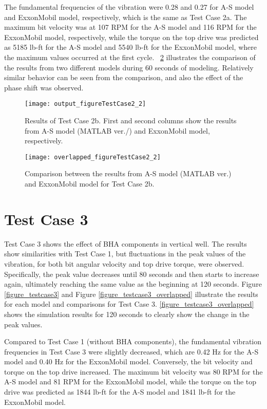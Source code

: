 The fundamental frequencies of the vibration were 0.28 and 0.27 for A-S model and ExxonMobil model, respectively, which is the same as Test Case 2a. The maximum bit velocity was at 107 RPM for the A-S model and 116 RPM for the ExxonMobil model, respectively, while the torque on the top drive was predicted as 5185 lb-ft for the A-S model and 5540 lb-ft for the ExxonMobil model, where the maximum values occurred at the first cycle. \figurename~\ref{figure_testcase2_2_overlapped} illustrates the comparison of the results from two different models during 60 seconds of modeling. Relatively similar behavior can be seen from the comparison, and also the effect of the phase shift was observed.

\begin{figure}
  \centering
  \texttt{[image: output\_figureTestCase2\_2]}
  \caption[Results of Test Case 2b]{Results of Test Case 2b. First and second columns show the results from A-S model (MATLAB ver./) and ExxonMobil model, respectively.}\label{figure_testcase2_2}
\end{figure}

\begin{figure}
  \centering
  \texttt{[image: overlapped\_figureTestCase2\_2]}
  \caption[Comparison of the results for Test Case 2b]{Comparison between the results from A-S model (MATLAB ver.) and ExxonMobil model for Test Case 2b.}\label{figure_testcase2_2_overlapped}
\end{figure}

\section{Test Case 3}
Test Case 3 shows the effect of BHA components in vertical well. The results show similarities with Test Case 1, but fluctuations in the peak values of the vibration, for both bit angular velocity and top drive torque, were observed. Specifically, the peak value decreases until 80 seconds and then starts to increase again, ultimately reaching the same value as the beginning at 120 seconds. Figure \ref{figure_testcase3} and Figure \ref{figure_testcase3_overlapped} illustrate the results for each model and comparisons for Test Case 3. \ref{figure_testcase3_overlapped} shows the simulation results for 120 seconds to clearly show the change in the peak values.

Compared to Test Case 1 (without BHA components), the fundamental vibration frequencies in Test Case 3 were slightly decreased, which are 0.42 Hz for the A-S model and 0.40 Hz for the ExxonMobil model. Conversely, the bit velocity and torque on the top drive increased. The maximum bit velocity was 80 RPM for the A-S model and 81 RPM for the ExxonMobil model, while the torque on the top drive was predicted as 1844 lb-ft for the A-S model and 1841 lb-ft for the ExxonMobil model. 

